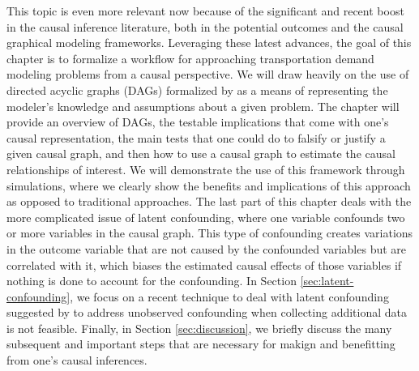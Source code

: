 This topic is even more relevant now because of the significant and recent boost in the causal inference literature, both in the potential outcomes and the causal graphical modeling frameworks.
Leveraging these latest advances, the goal of this chapter is to formalize a workflow for approaching 
transportation demand modeling problems from a causal perspective. 
We will draw heavily on the use of directed acyclic graphs (DAGs) formalized by \citet{pearl_causality_2000} as a means of representing the modeler's knowledge and assumptions about a given problem. 
The chapter will provide an overview of DAGs, the 
testable implications that come with one's causal representation, the main 
tests that one could do to falsify or justify a given causal graph, and then how 
to use a causal graph to estimate the causal relationships of interest. 
We will demonstrate the use of this framework through simulations, where we 
clearly show the benefits and implications of this approach as opposed to 
traditional approaches. 
The last part of this chapter deals with the more complicated issue of latent 
confounding, where one variable confounds two or more variables in the causal 
graph. This type of confounding creates variations in the outcome variable that are not caused by 
the confounded variables but are correlated with it, which biases the estimated 
causal effects of those variables if nothing is done to account for the 
confounding. 
In Section \ref{sec:latent-confounding}, we focus on a recent technique to deal with latent confounding suggested by \citet{wang_2019_blessings} to address unobserved confounding when collecting additional data is not feasible. 
Finally, in Section \ref{sec:discussion}, we briefly discuss the many subsequent and important steps that are necessary for makign and benefitting from one's causal inferences.
